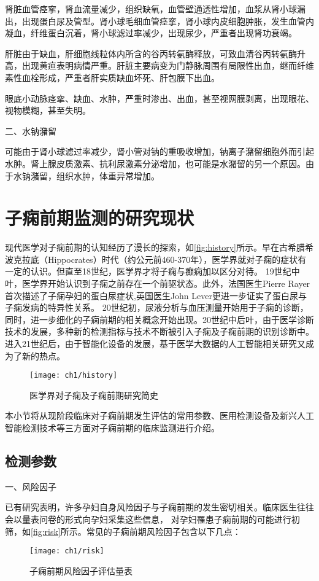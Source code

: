 肾脏血管痉挛，肾血流量减少，组织缺氧，血管壁通透性增加，血浆从肾小球漏出，出现蛋白尿及管型。肾小球毛细血管痉挛，肾小球内皮细胞肿胀，发生血管内凝血，纤维蛋白沉着，肾小球滤过率减少，出现尿少，严重者出现肾功衰竭。

肝脏由于缺血，肝细胞线粒体内所含的谷丙转氨酶释放，可致血清谷丙转氨酶升高，出现黄疸表明病情严重。肝脏主要病变为门静脉周围有局限性出血，继而纤维素性血栓形成，严重者肝实质缺血坏死、肝包膜下出血。

眼底小动脉痉挛、缺血、水肿，严重时渗出、出血，甚至视网膜剥离，出现眼花、视物模糊，甚至失明。

二、水钠潴留　

可能由于肾小球滤过率减少，肾小管对钠的重吸收增加，钠离子潴留细胞外而引起水肿。肾上腺皮质激素、抗利尿激素分泌增加，也可能是水潴留的另一个原因。由于水钠潴留，组织水肿，体重异常增加。

\section{子痫前期监测的研究现状}
现代医学对子痫前期的认知经历了漫长的探索\cite{BJOG2016}，如\autoref{fig:history}所示。早在古希腊希波克拉底（Hippocrates）时代（约公元前460-370年），医学界就对子痫的症状有一定的认识。但直至18世纪，医学界才将子痫与癫痫加以区分对待。
19世纪中叶，医学界开始认识到子痫之前存在一个前驱状态。此外，法国医生Pierre Rayer首次描述了子痫孕妇的蛋白尿症状,英国医生John Lever更进一步证实了蛋白尿与子痫发病的特异性关系。
20世纪初，尿液分析与血压测量开始用于子痫的诊断，同时，进一步细化的子痫前期的相关概念开始出现。20世纪中后叶，由于医学诊断技术的发展，多种新的检测指标与技术不断被引入子痫及子痫前期的识别诊断中。
进入21世纪后，由于智能化设备的发展，基于医学大数据的人工智能相关研究又成为了新的热点。
\begin{figure}[htbp]
    \centering
    \texttt{[image: ch1/history]}
    \caption{\label{fig:history}医学界对子痫及子痫前期研究简史}
\end{figure}

本小节将从现阶段临床对子痫前期发生评估的常用参数、医用检测设备及新兴人工智能检测技术等三方面对子痫前期的临床监测进行介绍。
\subsection{检测参数}
一、风险因子

已有研究表明，许多孕妇自身风险因子与子痫前期的发生密切相关\cite{Magee2008,FIGO,Lowe2015,Heazell2010}。临床医生往往会以量表问卷的形式向孕妇采集这些信息，
对孕妇罹患子痫前期的可能进行初筛\cite{risks}，如\autoref{fig:risk}所示。常见的子痫前期风险因子包含以下几点：
\begin{figure}[htbp]
    \centering
    \texttt{[image: ch1/risk]}
    \caption{\label{fig:risk}子痫前期风险因子评估量表}
\end{figure}

